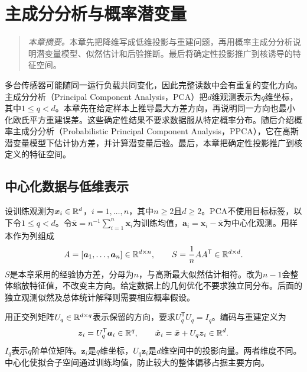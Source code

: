 \chapter{主成分分析与概率潜变量}
\label{chap:pca}
\begin{quote}\small
\textit{本章摘要。}本章先把降维写成低维投影与重建问题，再用概率主成分分析说明潜变量模型、似然估计和后验推断。最后将确定性投影推广到核诱导的特征空间。
\end{quote}

多台传感器可能随同一运行负载共同变化，因此完整读数中会有重复的变化方向。主成分分析（Principal Component Analysis，PCA）把$d$维观测表示为$q$维坐标，其中$1\le q<d$。本章先在给定样本上推导最大方差方向，再说明同一方向也最小化欧氏平方重建误差。这些确定性结果不要求数据服从特定概率分布。随后介绍概率主成分分析（Probabilistic Principal Component Analysis，PPCA），它在高斯潜变量模型下估计协方差，并计算潜变量后验。最后，本章把确定性投影推广到核定义的特征空间。

\section{中心化数据与低维表示}
设训练观测为$\bm x_i\in\mathbb{R}^d$，$i=1,\ldots,n$，其中$n\ge2$且$d\ge2$。PCA不使用目标标签，以下令$1\le q<d$。令$\bar{\bm x}=n^{-1}\sum_{i=1}^n\bm x_i$为训练均值，$\bm a_i=\bm x_i-\bar{\bm x}$为中心化观测。用样本作为列组成
\begin{equation}
 A=[\bm a_1,\ldots,\bm a_n]\in\mathbb{R}^{d\times n},\qquad
 S=\frac1n AA^{\mathsf T}\in\mathbb{R}^{d\times d}.
 \label{eq:pca-data-covariance}
\end{equation}
$S$是本章采用的经验协方差，分母为$n$，与高斯最大似然估计相符。改为$n-1$会整体缩放特征值，不改变主方向。给定数据上的几何优化不要求独立同分布。后面的独立观测似然及总体统计解释则需要相应概率假设。

用正交列矩阵$U_q\in\mathbb{R}^{d\times q}$表示保留的方向，要求$U_q^{\mathsf T}U_q=I_q$。编码与重建定义为
\begin{equation}
 \bm z_i=U_q^{\mathsf T}\bm a_i\in\mathbb{R}^q,\qquad
 \hat{\bm x}_i=\bar{\bm x}+U_q\bm z_i\in\mathbb{R}^d.
 \label{eq:pca-encode-decode}
\end{equation}
$I_q$表示$q$阶单位矩阵。$\bm z_i$是$q$维坐标，$U_q\bm z_i$是$d$维空间中的投影向量。两者维度不同。中心化使拟合子空间通过训练均值，防止较大的整体偏移占据主要方向。

